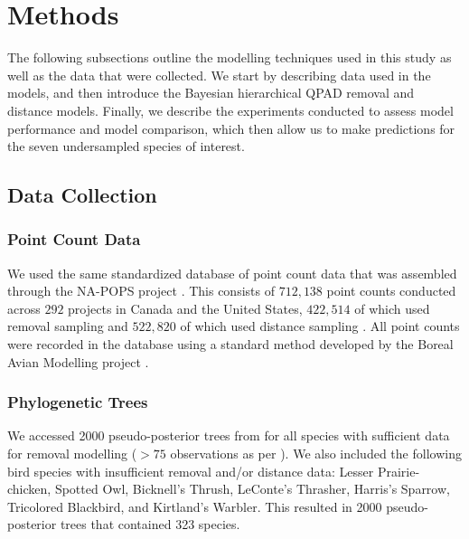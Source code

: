 \documentclass[12pt]{article}
\begin{document}
\section{Methods}

\par The following subsections outline the modelling techniques used in this study as well as the data that were collected. 
We start by describing data used in the models, and then introduce the Bayesian hierarchical QPAD removal and distance models.
Finally, we describe the experiments conducted to assess model performance and model comparison, which then allow us to make predictions for the seven undersampled species of interest.

\subsection{Data Collection}
\subsubsection{Point Count Data}
\par We used the same standardized database of point count data that was assembled through the NA-POPS project \cite{edwards_point_2023}. 
This consists of $712,138$ point counts conducted across $292$ projects in Canada and the United States, $422,514$ of which used removal sampling \citep{alldredge_time--detection_2007, farnsworth_removal_2002} and $522,820$ of which used distance sampling \citep{buckland_introduction_2001, buckland_distance_2015}.
 All point counts were recorded in the database using a standard method developed by the Boreal Avian Modelling project \citep{barker_ecological_2015}.

\subsubsection{Phylogenetic Trees}
\par We accessed 2000 pseudo-posterior trees from \citet{jetz_global_2012} for all species with sufficient data for removal modelling ($>75$ observations as per \cite{edwards_point_2023,solymos_evaluating_2018,buckland_introduction_2001}). 
We also included the following bird species with insufficient removal and/or distance data: Lesser Prairie-chicken, Spotted Owl, Bicknell's Thrush, LeConte's Thrasher, Harris's Sparrow, Tricolored Blackbird, and Kirtland's Warbler. 
This resulted in 2000 pseudo-posterior trees that contained 323 species.
\end{document}
